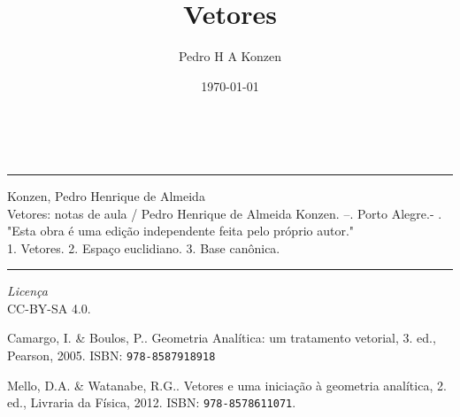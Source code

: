 \documentclass[12pt]{book}
\begin{document}
\frontmatter

\title{Vetores}
\author{Pedro H A Konzen}
\date{\today}
\maketitle

\ifisbook
~
\vspace{4.5in}
\hrule
Konzen, Pedro Henrique de Almeida\\
\indent\hspace{2em}Vetores: notas de aula / Pedro Henrique de Almeida Konzen. --{\the\year}. Porto Alegre.- {\the\year}.\\
\indent\hspace{2em}"Esta obra é uma edição independente feita pelo próprio autor."\\
\indent\hspace{2em}1. Vetores. 2. Espaço euclidiano. 3. Base canônica.\\
\hrule
\vspace{1cm}
\begin{center}
  \textit{Licença}\\CC-BY-SA 4.0.
\end{center}
\fi





\ifishtml
\clearpage
{}
{}
\fi
\tableofcontents

\mainmatter

% 







\ifisbook
\clearpage
{}
{}
\fi

\begin{thebibliography}{99}
    Camargo, I. \& Boulos, P.. Geometria Analítica: um tratamento vetorial, 3. ed., Pearson, 2005. ISBN: \texttt{978-8587918918}
  
    Mello, D.A. \& Watanabe, R.G.. Vetores e uma iniciação à geometria analítica, 2. ed., Livraria da Física, 2012. ISBN: \texttt{978-8578611071}.

\end{thebibliography} 

\end{document}
